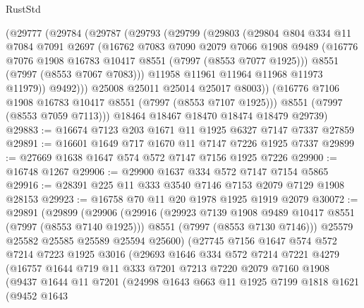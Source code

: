 \begin{lexlean}{RustStd}
\begin{coremodule}
{\begin{coremodule}
{{{{{{{{{{{{{{{{{{{{{{{{{{{{{{{{{{{{{{{{{{{        (@29777
          (@29784
            (@29787
              (@29793
                (@29799
                  (@29803
                    (@29804
                      @804
                      @334
                      @11
                      @7084
                      @7091
                      @2697
                      (@16762
                        @7083
                        @7090
                        @2079
                        @7066
                        @1908
                        @9489
                        (@16776 @7076 @1908 @16783 @10417 @8551 (@7997 (@8553 @7077 @1925)))
                        @8551
                        (@7997 (@8553 @7067 @7083)))
                      @11958
                      @11961
                      @11964
                      @11968
                      @11973
                      @11979))
                  @9492)))
            @25008
            @25011
            @25014
            @25017
            @8003))
        (@16776 @7106 @1908 @16783 @10417 @8551 (@7997 (@8553 @7107 @1925)))
        @8551
        (@7997 (@8553 @7059 @7113)))
      @18464
      @18467
      @18470
      @18474
      @18479
      @29739)
@29883 := @16674 @7123 @203 @1671 @11 @1925 @6327 @7147 @7337 @27859
@29891 := @16601 @1649 @717 @1670 @11 @7147 @7226 @1925 @7337
@29899 := @27669 @1638 @1647 @574 @572 @7147 @7156 @1925 @7226
@29900 := @16748 @1267
@29906 := @29900 @1637 @334 @572 @7147 @7154 @5865
@29916 := @28391 @225 @11 @333 @3540 @7146 @7153 @2079 @7129 @1908 @28153
@29923 := @16758 @70 @11 @20 @1978 @1925 @1919 @2079
@30072 := @29891
    (@29899
      (@29906
        (@29916
          (@29923 @7139 @1908 @9489 @10417 @8551 (@7997 (@8553 @7140 @1925)))
          @8551
          (@7997 (@8553 @7130 @7146)))
        @25579
        @25582
        @25585
        @25589
        @25594
        @25600)
      (@27745
        @7156
        @1647
        @574
        @572
        @7214
        @7223
        @1925
        @3016
        (@29693
          @1646
          @334
          @572
          @7214
          @7221
          @4279
          (@16757
            @1644
            @719
            @11
            @333
            @7201
            @7213
            @7220
            @2079
            @7160
            @1908
            (@9437
              @1644
              @11
              @7201
              (@24998
                @1643
                @663
                @11
                @1925
                @7199
                @1818
                @1621
                (@9452
                  @1643
}}}}}}}}}}}}}}}}}}}}}}}}}}}}}}}}}}}}}}}}}}}
\end{coremodule}}
\end{coremodule}
\end{lexlean}
